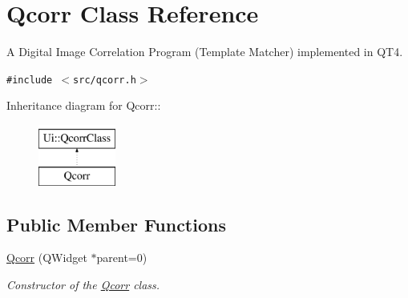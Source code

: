 \hypertarget{classQcorr}{
\section{Qcorr Class Reference}
\label{classQcorr}
}
A Digital Image Correlation Program (Template Matcher) implemented in QT4.  


{\tt \#include $<$src/qcorr.h$>$}

Inheritance diagram for Qcorr::\begin{figure}[H]
\begin{center}
\leavevmode
\includegraphics[height=2cm]{classQcorr}
\end{center}
\end{figure}
\subsection*{Public Member Functions}
\begin{CompactItemize}
\item 
\hypertarget{classQcorr_3b5d03aed21bfd00497ff265d898e45b}{
\hyperlink{classQcorr_3b5d03aed21bfd00497ff265d898e45b}{Qcorr} (QWidget $\ast$parent=0)}
\label{classQcorr_3b5d03aed21bfd00497ff265d898e45b}

\begin{CompactList}\small\item\em Constructor of the \hyperlink{classQcorr}{Qcorr} class. \item\end{CompactList}\end{CompactItemize}
